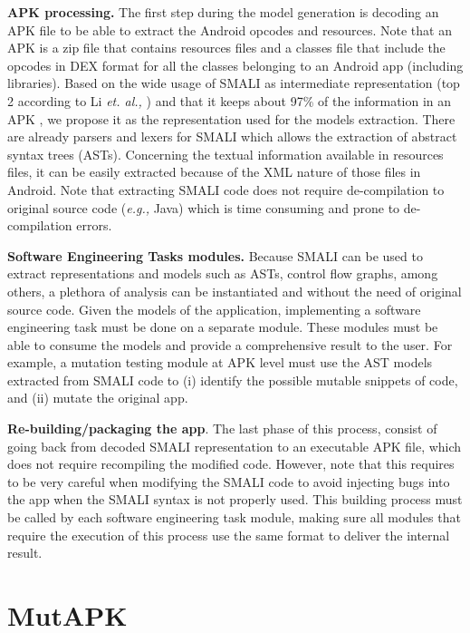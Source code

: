 \textbf{APK processing.} The first step during the model generation is  decoding an APK file to be able to extract the Android opcodes and resources. Note that an APK is a zip file that contains resources files and a classes file that include the opcodes in DEX format for all the classes belonging to an Android app (including libraries). Based on the wide usage of SMALI as intermediate representation (top 2 according to Li \textit{et. al.,} \cite{li:IST2017}) and that it keeps about 97\% of the information in an APK  \cite{arnatovich2014empirical,arnatovich2018comparison}, we propose it as the representation used for the models extraction. There are already parsers and lexers for SMALI which allows the extraction of abstract syntax trees (ASTs). Concerning the textual information available in resources files, it can be easily extracted because of the XML nature of those files in Android. Note that extracting SMALI code does not require de-compilation to original source code (\textit{e.g.,} Java) which is time consuming and prone to de-compilation errors.

\textbf{Software Engineering Tasks modules.} Because SMALI can be used to extract representations and models such as ASTs, control flow graphs, among others, a plethora of analysis can be instantiated and without the need of original source code. Given the models of the application, implementing a software engineering task must be done on a separate module. These modules must be able to consume the models and provide a comprehensive result to the user. For example, a mutation testing module at APK level must use the AST models extracted from SMALI code to (i) identify the possible mutable snippets of code, and (ii) mutate the original app.


\textbf{Re-building/packaging the app}.
The last phase of this process, consist of going back from decoded SMALI representation to an executable APK file, which does not require recompiling the modified code. However, note that this requires to be very careful when modifying the SMALI code to avoid injecting bugs into the app when the SMALI syntax is not properly used.%
This building process must be called by each software engineering task module, making sure all modules that require the execution of this process use the same format to deliver the internal result.



\section{MutAPK}

